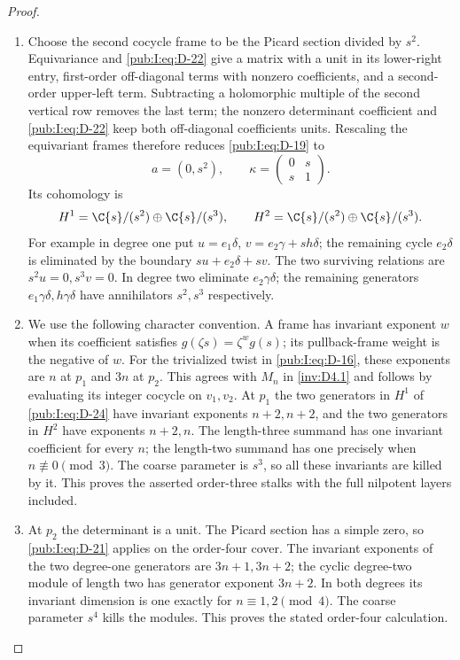 \begin{proof}
\begin{enumerate}[label=\arabic*.,leftmargin=*]
\item Choose the second cocycle frame to be the Picard section divided by
$s^2$. Equivariance and \eqref{pub:I:eq:D-22} give a matrix with a unit in its
lower-right entry, first-order off-diagonal terms with nonzero
coefficients, and a second-order upper-left term. Subtracting a
holomorphic multiple of the second vertical row removes the last
term; the nonzero determinant coefficient and \eqref{pub:I:eq:D-22} keep both
off-diagonal coefficients units. Rescaling the equivariant frames
therefore reduces \eqref{pub:I:eq:D-19} to
\begin{equation}
 a=(0,s^2),\qquad \kappa=\begin{pmatrix}0&s\\s&1\end{pmatrix}.
\label{pub:I:eq:D-23}
\end{equation}
Its cohomology is
\begin{equation}
 H^1=\C\{s\}/(s^2)\oplus\C\{s\}/(s^3),\qquad
 H^2=\C\{s\}/(s^2)\oplus\C\{s\}/(s^3).
\label{pub:I:eq:D-24}
\end{equation}
For example in degree one put
$u=e_1\delta$, $v=e_2\gamma+s h\delta$; the remaining cycle
$e_2\delta$ is eliminated by the boundary
$s u+e_2\delta+s v$. The two surviving relations are
$s^2u=0,s^3v=0$. In degree two eliminate $e_2\gamma\delta$;
the remaining generators $e_1\gamma\delta,h\gamma\delta$
have annihilators $s^2,s^3$ respectively.

\item We use the following character convention.
A frame has invariant exponent $w$ when its coefficient satisfies
$g(\zeta s)=\zeta^w g(s)$; its pullback-frame weight is the negative
of $w$. For the trivialized twist in \eqref{pub:I:eq:D-16}, these exponents are
$n$ at $p_1$ and $3n$ at $p_2$. This agrees with $M_n$ in \ref{inv:D4.1}
and follows by evaluating its integer cocycle on $v_1,v_2$.
At $p_1$ the two generators in $H^1$ of \eqref{pub:I:eq:D-24} have invariant
exponents $n+2,n+2$, and the two generators in $H^2$ have exponents
$n+2,n$. The length-three summand has one invariant coefficient
for every $n$; the length-two summand has one precisely when
$n\not\equiv0\pmod3$. The coarse parameter is $s^3$, so all these
invariants are killed by it. This proves the asserted order-three
stalks with the full nilpotent layers included.

\item At $p_2$ the determinant is a unit. The Picard section has a simple
zero, so \eqref{pub:I:eq:D-21} applies on the order-four cover. The invariant
exponents of the two degree-one generators are $3n+1,3n+2$;
the cyclic degree-two module of length two has generator exponent
$3n+2$. In both degrees its invariant dimension is one exactly for
$n\equiv1,2\pmod4$. The coarse parameter $s^4$ kills the modules.
This proves the stated order-four calculation. \end{enumerate}
\end{proof}